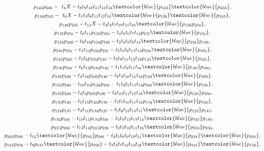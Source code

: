 \documentclass[pdftex]{sigma}%
\numberwithin{equation}{section}
\begin{document}
\begin{gather*}
\\[.2ex]
p_{145}p_{236}-{}_{\phantom{1}}t_{4}X-t_{8}t_{9}t_{10}t_{11}t_{15}t_{16}\textcolor{blue}{p_{123}}\textcolor{blue}{p_{456}},\\[.2ex]
p_{136}p_{245}-{}_{\phantom{1}} t_{6}X - t_{1}t_{3}t_{8}t_{11}t_{12}t_{16}\textcolor{blue}{p_{126}}\textcolor{blue}{p_{345}},\\[.2ex]
p_{146}p_{235} - t_{13}X - t_{2}t_{3}t_{7}t_{10}t_{11}t_{16}\textcolor{blue}{p_{156}p_{234}},
\\[.2ex]
p_{135}p_{256}-t_{8}t_{11}p_{125}p_{356}-t_{4}t_{5}t_{6}t_{7}t_{14}p_{235}\textcolor{blue}{p_{156}},\\[.2ex]
p_{134}p_{246}-t_{8}t_{16}p_{124}p_{346}-t_{2}t_{4}t_{5}t_{6}t_{14}\textcolor{blue}{p_{234}}p_{146},\\[.2ex]
p_{246}p_{356}-t_{3}t_{16}p_{346}p_{256}-t_{5}t_{6}t_{9}t_{13}t_{14}p_{236}\textcolor{blue}{p_{456}},\\[.2ex]
p_{135}p_{245}-t_{5}t_{6}p_{235}p_{145}-t_{3}t_{8}t_{11}t_{12}t_{16}p_{125}\textcolor{blue}{p_{345}},\\[.2ex]
p_{136}p_{246}-t_{6}t_{14}p_{236}p_{146}-t_{1}t_{3}t_{8}t_{11}t_{16}\textcolor{blue}{p_{126}}p_{346},\\[.2ex]
p_{145}p_{246}-t_{4}t_{14}p_{245}p_{146}-t_{8}t_{9}t_{10}t_{11}t_{16}p_{124}\textcolor{blue}{p_{456}},\\[.2ex]
p_{125}p_{246}-t_{10}t_{16}p_{124}p_{256}-t_{1}t_{4}t_{5}t_{13}t_{14}p_{245}\textcolor{blue}{p_{126}},\\[.2ex]
p_{135}p_{236}-t_{4}t_{5}p_{235}p_{136}-t_{8}t_{10}t_{11}t_{15}t_{16}\textcolor{blue}{p_{123}}p_{356},\\[.2ex]
p_{135}p_{146}-t_{5}t_{13}p_{145}p_{136}-t_{3}t_{7}t_{10}t_{11}t_{16}p_{134}\textcolor{blue}{p_{156}},\\[.2ex]
p_{124}p_{135}-t_{3}t_{11}p_{134}p_{125}-t_{5}t_{6}t_{13}t_{14}t_{15}\textcolor{blue}{p_{123}}p_{145},\\[.2ex]
p_{135}p_{346}-t_{10}t_{11}p_{134}p_{356}-t_{4}t_{5}t_{12}t_{13}t_{14}\textcolor{blue}{p_{345}}p_{136},\\[.2ex]
p_{235}p_{246}-t_{13}t_{14}p_{245}p_{236}-t_{2}t_{3}t_{10}t_{11}t_{16}\textcolor{blue}{p_{234}}p_{256},\\[.2ex]
%
p_{245}p_{346}-t_{12}\textcolor{blue}{p_{345}}p_{246}-t_{2}t_{5}t_{6}t_{9}t_{10}t_{11}\textcolor{blue}{p_{234}}\textcolor{blue}{p_{456}},\\[.2ex]
p_{145}p_{356}-t_{9}p_{135}\textcolor{blue}{p_{456}}-t_{3}t_{4}t_{7}t_{12}t_{14}t_{16}\textcolor{blue}{p_{345}}\textcolor{blue}{p_{156}},\\[.2ex]

\end{gather*}
\end{document}
